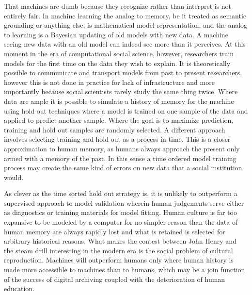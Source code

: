 \documentclass[]{book}
\theoremstyle{definition}
\theoremstyle{definition}
\theoremstyle{definition}
\theoremstyle{remark}
\begin{document}
That machines are dumb because they recognize rather than interpret is
not entirely fair. In machine learning the analog to memory, be it
treated as semantic grounding or anything else, is mathematical model
representation, and the analog to learning is a Bayesian updating of old
models with new data. A machine seeing new data with an old model can
indeed see more than it perceives. At this moment in the era of
computational social science, however, researchers train models for the
first time on the data they wish to explain. It is theoretically
possible to communicate and transport models from past to present
researchers, however this is not done in practice for lack of
infrastructure and more importantly because social scientists rarely
study the same thing twice. Where data are ample it is possible to
simulate a history of memory for the machine using hold out techniques
where a model is trained on one sample of the data and applied to
predict another sample. Where the goal is to maximize prediction,
training and hold out samples are randomly selected. A different
approach \citep[e.g.~][]{Nay2017Predicting} involves selecting training
and hold out as a process in time. This is a closer approximation to
human memory, as humans always approach the present only armed with a
memory of the past. In this sense a time ordered model training process
may create the same kind of errors on new data that a social institution
would.

As clever as the time sorted hold out strategy is, it is unlikely to
outperform a supervised approach to model validation wherein human
judgements serve either as diagnostics or training materials for model
fitting. Human culture is far too expansive to be modeled by a computer
for no simpler reason than the data of human memory are always rapidly
lost and what is retained is selected for arbitrary historical reasons.
What makes the contest between John Henry and the steam drill
interesting in the modern era is the social problem of cultural
reproduction. Machines will outperform humans only where human history
is made more accessible to machines than to humans, which may be a join
function of the success of digital archiving coupled with the
deterioration of human education.
\end{document}
